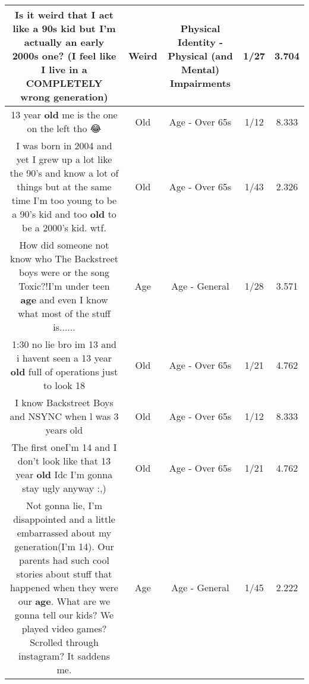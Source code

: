 \documentclass[11pt]{article}
\newlength\mylength
\begin{document}
\begin{center}
\begin{longtable}{|C{.65\mylength}|C{.30\mylength}|C{.12\mylength}|C{.12\mylength}|C{.12\mylength}|}
  \small Is it \textbf{weird} that I act like a 90s kid but I'm actually an early 2000s one? (I feel like I live in a COMPLETELY wrong generation)\normalsize   & Weird & Physical Identity - Physical (and Mental) Impairments & 1/27 & 3.704 \\  \hline
  \small 13 year \textbf{old} me is the one on the left tho 😂\normalsize   & Old & Age - Over 65s & 1/12 & 8.333 \\  \hline
  \small I was born in 2004 and yet I grew up a lot like the 90's and know a lot of things but at the same time I'm too young to be a 90's kid and too \textbf{old} to be a 2000's kid. wtf.\normalsize   & Old & Age - Over 65s & 1/43 & 2.326 \\  \hline
  \small How did someone not know who The Backstreet boys were or the song Toxic?!I'm under teen \textbf{age} and even I know what most of the stuff is......\normalsize   & Age & Age - General & 1/28 & 3.571 \\  \hline
  \small 1:30 no lie bro im 13 and i havent seen a 13 year \textbf{old} full of operations just to look 18\normalsize   & Old & Age - Over 65s & 1/21 & 4.762 \\  \hline
  \small I know Backstreet Boys and NSYNC when l was 3 years old\normalsize   & Old & Age - Over 65s & 1/12 & 8.333 \\  \hline
  \small The first oneI'm 14 and I don't look like that 13 year \textbf{old} Idc I'm gonna stay ugly anyway :,)\normalsize   & Old & Age - Over 65s & 1/21 & 4.762 \\  \hline
  \small Not gonna lie, I'm disappointed and a little embarrassed about my generation(I'm 14). Our parents had such cool stories about stuff that happened when they were our \textbf{age}. What are we gonna tell our kids? We played video games? Scrolled through instagram? It saddens me.\normalsize   & Age & Age - General & 1/45 & 2.222 \\  \hline

\end{longtable}
\end{center}
\end{document}
